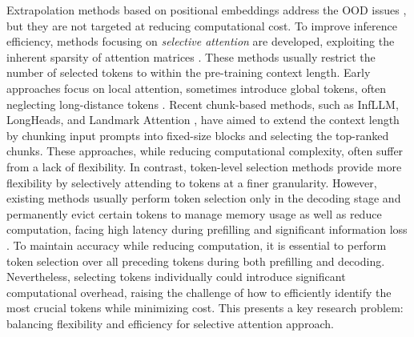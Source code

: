 Extrapolation methods based on positional embeddings address the OOD issues \citep{chen2023extending, bloc97ntk, peng2023yarn}, but they are not targeted at reducing computational cost.
To improve inference efficiency, methods focusing on \emph{selective attention} are developed, exploiting the inherent sparsity of attention matrices \citep{zhang2024h2o, Jiang:2024}. These methods usually restrict the number of selected tokens to within the pre-training context length. Early approaches focus on local attention, sometimes introduce global tokens, often neglecting long-distance tokens \citep{Beltagy2020LongformerTL,xiao2023efficient, han2023lm}. Recent chunk-based methods, such as InfLLM, LongHeads, and Landmark Attention \citep{xiao2024infllm, lu2024longheads, mohtashami2023landmark}, have aimed to extend the context length by chunking input prompts into fixed-size blocks and selecting the top-ranked chunks. 
These approaches, while reducing computational complexity, often suffer from a lack of flexibility. 
In contrast, token-level selection methods provide more flexibility by selectively attending to tokens at a finer granularity.
However, existing methods usually perform token selection only in the decoding stage and permanently evict certain tokens to manage memory usage as well as reduce computation, facing high latency during prefilling and significant information loss \citep{zhang2024h2o,liu2024scissorhands,ge2023model,li2024snapkv,Cai2024PyramidKVDK}.
To maintain accuracy while reducing computation, it is essential to perform token selection over all preceding tokens during both prefilling and decoding. Nevertheless, selecting tokens individually could introduce significant computational overhead, raising the challenge of how to efficiently identify the most crucial tokens while minimizing cost. This presents a key research problem: balancing flexibility and efficiency for selective attention approach.


